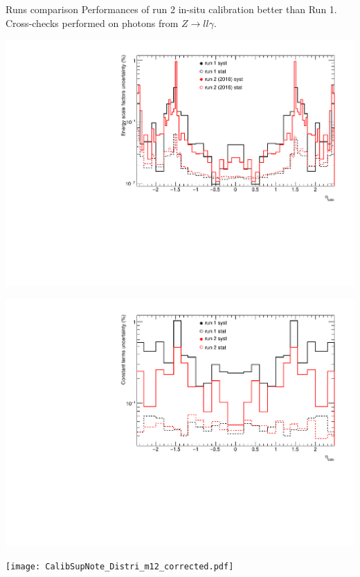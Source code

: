 \begin{frame}{Runs comparison}
  Performances of run 2 in-situ calibration better than Run 1.
  Cross-checks performed on photons from $Z\rightarrow ll\gamma$.\\
  \begin{minipage}{0.42\linewidth} 
    \includegraphics[width=\linewidth]{Figures/CompareSystRun_alpha.pdf}
  \end{minipage}
  \hfill
  \begin{minipage}{0.42\linewidth}
    \includegraphics[width=\linewidth]{Figures/CompareSystRun_c.pdf}
  \end{minipage}
  \centering
  \begin{minipage}{0.47\linewidth}
    \texttt{[image: CalibSupNote\_Distri\_m12\_corrected.pdf]}
  \end{minipage}

\end{frame}

